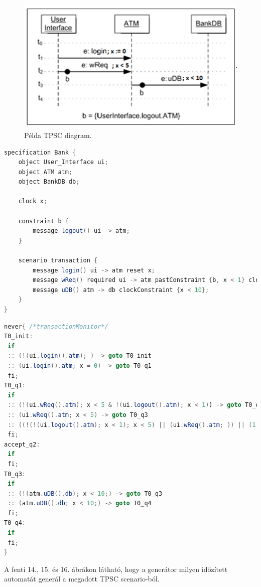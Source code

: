 \begin{figure}[h!]
    \centering
    \includegraphics[width=150mm, keepaspectratio]{figures/14abra.png}
    \caption{Példa TPSC diagram.}
\end{figure}

\begin{lstlisting}[language=java,frame=single, float=h!, caption={TPSC scenario szöveges leírása.},captionpos=b]
specification Bank {
	object User_Interface ui;
	object ATM atm;
	object BankDB db;

	clock x;

	constraint b {
		message logout() ui -> atm;
	}

	scenario transaction {
		message login() ui -> atm reset x;
		message wReq() required ui -> atm pastConstraint {b, x < 1} clockConstraint {x < 5};
		message uDB() atm -> db clockConstraint {x < 10};
	}
}
\end{lstlisting}

\begin{lstlisting}[language=java,frame=single, float=h!, caption={Generált időzített automata never claim formátumban.},captionpos=b]
never{ /*transactionMonitor*/
T0_init:
 if
 :: (!(ui.login().atm); ) -> goto T0_init
 :: (ui.login().atm; x = 0) -> goto T0_q1
 fi;
T0_q1:
 if
 :: (!(ui.wReq().atm); x < 5 & !(ui.logout().atm); x < 1)) -> goto T0_q1
 :: (ui.wReq().atm; x < 5) -> goto T0_q3
 :: ((!(!(ui.logout().atm); x < 1); x < 5) || (ui.wReq().atm; )) || (1, x >= 5))) -> goto accept_q2
 fi;
accept_q2:
 if
 fi;
T0_q3:
 if
 :: (!(atm.uDB().db); x < 10;) -> goto T0_q3
 :: (atm.uDB().db; x < 10;) -> goto T0_q4
 fi;
T0_q4:
 if
 fi;
}
\end{lstlisting}

A fenti 14., 15. és 16. ábrákon látható, hogy a generátor milyen időzített automatát generál a megadott TPSC scenario-ból.